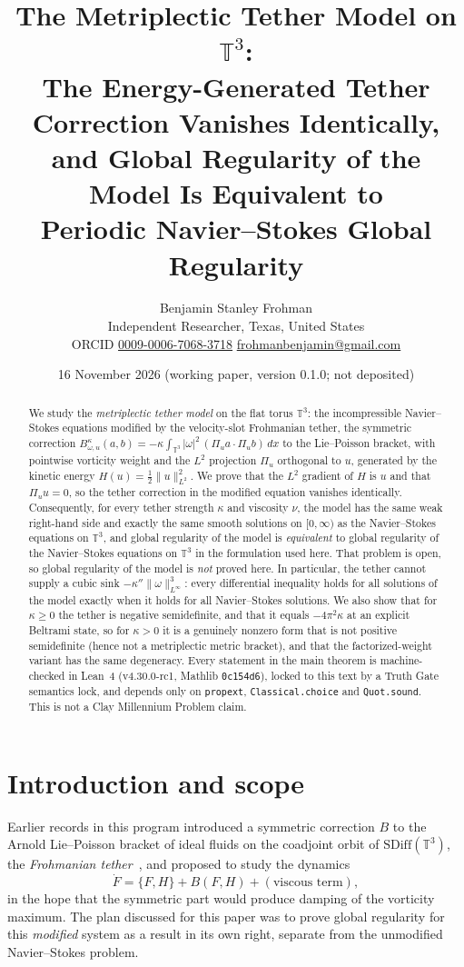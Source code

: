 \documentclass[11pt,a4paper]{article}
\title{The Metriplectic Tether Model on $\mathbb{T}^3$:\\
The Energy-Generated Tether Correction Vanishes Identically,\\
and Global Regularity of the Model Is Equivalent to\\
Periodic Navier--Stokes Global Regularity}
\author{Benjamin Stanley Frohman\\[2pt]
\small Independent Researcher, Texas, United States\\
\small ORCID \href{https://orcid.org/0009-0006-7068-3718}{0009-0006-7068-3718} \quad
\href{mailto:frohmanbenjamin@gmail.com}{frohmanbenjamin@gmail.com}}
\date{16 November 2026 \quad (working paper, version 0.1.0; not deposited)}
\theoremstyle{definition}
\theoremstyle{remark}
\newcommand{\T}{\mathbb{T}^3}
\newcommand{\lean}[1]{\texttt{#1}}
\begin{document}
\maketitle

\begin{abstract}
We study the \emph{metriplectic tether model} on the flat torus $\T$: the incompressible
Navier--Stokes equations modified by the velocity-slot Frohmanian tether, the symmetric
correction
$B^{\kappa}_{\omega,u}(a,b)=-\kappa\int_{\T}|\omega|^2\,(\Pi_u a\cdot\Pi_u b)\,dx$
to the Lie--Poisson bracket, with pointwise vorticity weight and the $L^2$ projection $\Pi_u$
orthogonal to $u$, generated by the kinetic energy $H(u)=\frac12\|u\|_{L^2}^2$.
We prove that the $L^2$ gradient of $H$ is $u$ and that $\Pi_u u=0$, so the tether correction
in the modified equation vanishes identically.
Consequently, for every tether strength $\kappa$ and viscosity $\nu$, the model has the same weak
right-hand side and exactly the same smooth solutions on $[0,\infty)$ as the Navier--Stokes
equations on $\T$, and global regularity of the model is \emph{equivalent} to global regularity
of the Navier--Stokes equations on $\T$ in the formulation used here.
That problem is open, so global regularity of the model is \emph{not} proved here. In particular,
the tether cannot supply a cubic sink $-\kappa''\|\omega\|_{L^\infty}^3$: every
differential inequality holds for all solutions of the model exactly when it holds for all
Navier--Stokes solutions. We also show that for $\kappa\ge0$ the tether is negative semidefinite, and that it equals
$-4\pi^2\kappa$ at an explicit Beltrami state, so for $\kappa>0$ it is a genuinely nonzero form
that is not positive semidefinite (hence not a metriplectic metric bracket), and that the factorized-weight variant has the same degeneracy.
Every statement in the main theorem is machine-checked in Lean~4 (v4.30.0-rc1, Mathlib
\texttt{0c154d6}), locked to this text by a Truth Gate semantics lock, and depends only on
\lean{propext}, \lean{Classical.choice} and \lean{Quot.sound}.
This is not a Clay Millennium Problem claim.
\end{abstract}

\section{Introduction and scope}

Earlier records in this program introduced a symmetric correction $B$ to the Arnold
Lie--Poisson bracket of ideal fluids on the coadjoint orbit of $\mathrm{SDiff}(\T)$, the
\emph{Frohmanian tether}~\cite{Fr21856430}, and proposed to study the dynamics
\begin{equation}\label{eq:gen}
\dot F=\{F,H\}+B(F,H)+(\text{viscous term}),
\end{equation}
in the hope that the symmetric part would produce damping of the vorticity maximum. The plan
discussed for this paper was to prove global regularity for this \emph{modified} system as a
result in its own right, separate from the unmodified Navier--Stokes problem.
\end{document}
